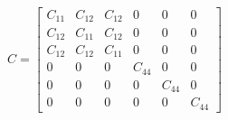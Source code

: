 \documentclass[preview]{standalone}
\begin{document}
\begin{align*}
C = \begin{bmatrix}
            C_{11} & C_{12} & C_{12} & 0 & 0 & 0 \\
            C_{12} & C_{11} & C_{12} & 0 & 0 & 0 \\
            C_{12} & C_{12} & C_{11} & 0 & 0 & 0 \\
            0 & 0 & 0 & C_{44} & 0 & 0 \\
            0 & 0 & 0 & 0 & C_{44} & 0 \\
            0 & 0 & 0 & 0 & 0 & C_{44}
            \end{bmatrix}
\end{align*}
\end{document}
